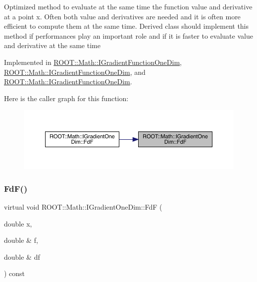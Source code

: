 Optimized method to evaluate at the same time the function value and derivative at a point x. Often both value and derivatives are needed and it is often more efficient to compute them at the same time. Derived class should implement this method if performances play an important role and if it is faster to evaluate value and derivative at the same time 

Implemented in \mbox{\hyperlink{classROOT_1_1Math_1_1IGradientFunctionOneDim_a01eaedb2ae1dfa5722f11281acf7a72b}{R\+O\+O\+T\+::\+Math\+::\+I\+Gradient\+Function\+One\+Dim}}, \mbox{\hyperlink{classROOT_1_1Math_1_1IGradientFunctionOneDim_a01eaedb2ae1dfa5722f11281acf7a72b}{R\+O\+O\+T\+::\+Math\+::\+I\+Gradient\+Function\+One\+Dim}}, and \mbox{\hyperlink{classROOT_1_1Math_1_1IGradientFunctionOneDim_a01eaedb2ae1dfa5722f11281acf7a72b}{R\+O\+O\+T\+::\+Math\+::\+I\+Gradient\+Function\+One\+Dim}}.

Here is the caller graph for this function\+:
\nopagebreak
\begin{figure}[H]
\begin{center}
\leavevmode
\includegraphics[width=350pt]{da/d8e/classROOT_1_1Math_1_1IGradientOneDim_aef5560ea7d43e64d94bf875713e2a5fc_icgraph}
\end{center}
\end{figure}
\mbox{\label{classROOT_1_1Math_1_1IGradientOneDim_aef5560ea7d43e64d94bf875713e2a5fc}} 
\subsubsection{\texorpdfstring{FdF()}{FdF()}\hspace{0.1cm}{\footnotesize\ttfamily [2/6]}}
{\footnotesize\ttfamily virtual void R\+O\+O\+T\+::\+Math\+::\+I\+Gradient\+One\+Dim\+::\+FdF (\begin{DoxyParamCaption}\item[{double}]{x,  }\item[{double \&}]{f,  }\item[{double \&}]{df }\end{DoxyParamCaption}) const\hspace{0.3cm}{\ttfamily [pure virtual]}}

